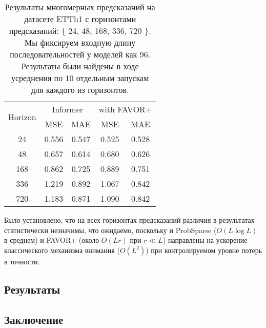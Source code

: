 \begin{table}[!ht]
    \centering
    \begin{tabular}{c  cc  cc}
    \toprule
    \multirow{2}{*}{{Horizon}} 
      & \multicolumn{2}{c}{{Informer}} 
      & \multicolumn{2}{c}{with FAVOR+} \\
    \cmidrule(lr){2-3} \cmidrule(lr){4-5}
      & {MSE} & {MAE} 
      & {MSE} & {MAE} \\
    \midrule
    24   & 0.556 & 0.547 & 0.525 & 0.528 \\
    48   & 0.657 & 0.614 & 0.680 & 0.626 \\
    168  & 0.862 & 0.725 & 0.889 & 0.751 \\
    336  & 1.219 & 0.892 & 1.067 & 0.842 \\
    720  & 1.183 & 0.871 & 1.090 & 0.842 \\
    \bottomrule
    \end{tabular}
    \caption{Результаты многомерных предсказаний на датасете ETTh1 с 
    горизонтами предсказаний: \{ 24, 48, 168, 336, 720 \}. 
    Мы фиксируем входную длину последовательностей у моделей как 96.
    Результаты были найдены в ходе усреднения по 10 отдельным запускам 
    для каждого из горизонтов.}
    \label{tab:etth1-favor}
\end{table}

Было установлено, что на всех горизонтах предсказаний различия в результатах 
статистически незначимы, что ожидаемо, поскольку и ProbSparse ($O(L \log L)$ в среднем) 
и FAVOR+ (около $O(Lr)$ при $r \ll L$) направлены на ускорение классического механизма 
внимания ($O(L^2)$) при контролируемом уровне потерь в точности.



\subsection{Результаты}


\subsection{Заключение}
